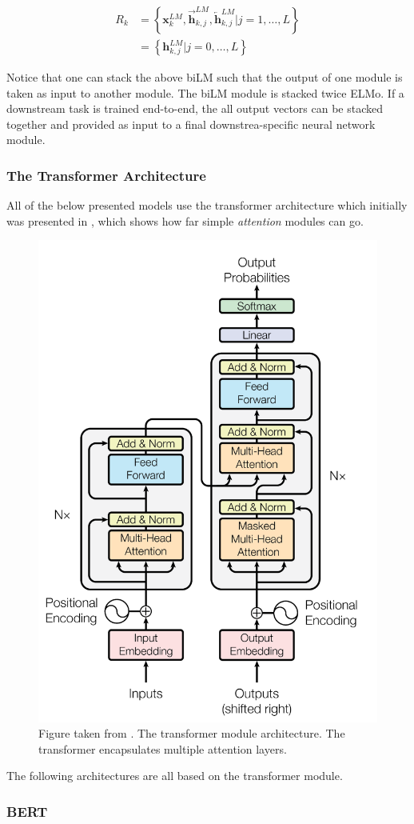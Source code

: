 \documentclass[a4paper,12pt,twoside,openright]{report}
\begin{document}
\begin{align} 
R_{k} &=\left\{\mathbf{x}_{k}^{L M}, \overrightarrow{\mathbf{h}}_{k, j}^{L M}, \overleftarrow{\mathbf{h}}_{k, j}^{L M} | j=1, \ldots, L\right\} \\ &=\left\{\mathbf{h}_{k, j}^{L M} | j=0, \ldots, L\right\} 
\end{align}

Notice that one can stack the above biLM such that the output of one module is taken as input to another module.
The biLM module is stacked twice ELMo.
If a downstream task is trained end-to-end, the all output vectors can be stacked together and provided as input to a final downstrea-specific neural network module.

\subsubsection{The Transformer Architecture}

All of the below presented models use the transformer architecture which initially was presented in \cite{vaswani17}, which shows how far simple \textit{attention} modules can go.


\begin{figure}[h]
	\center
  \includegraphics[width=0.4\linewidth]{./assets/background/transformer_module.png}
  \caption{Figure taken from \cite{vaswani17}. The transformer module architecture. The transformer encapsulates multiple attention layers.}
  \label{fig:cbow_skipgram}
\end{figure}



The following architectures are all based on the transformer module.

\subsubsection{BERT}
\end{document}

